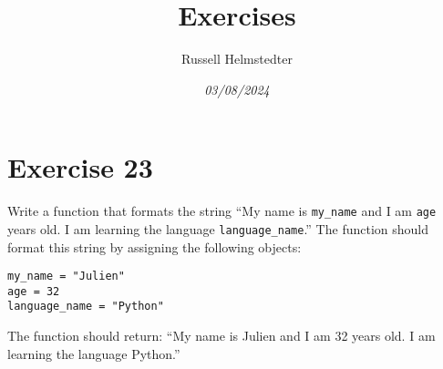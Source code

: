 \documentclass[11pt]{article}
\author{Russell Helmstedter}
\date{\textit{03/08/2024}}
\title{Exercises}
\begin{document}
\maketitle
\tableofcontents

\section{Exercise 23}
\label{sec:orgff34399}
Write a function that formats the string ``My name is \texttt{my\_name} and I am \texttt{age} years old. I am learning the language \texttt{language\_name}.'' The function should format this string by assigning the following objects:

\begin{verbatim}
my_name = "Julien"
age = 32
language_name = "Python"
\end{verbatim}

The function should return: ``My name is Julien and I am 32 years old. I am learning the language Python.''
\end{document}
